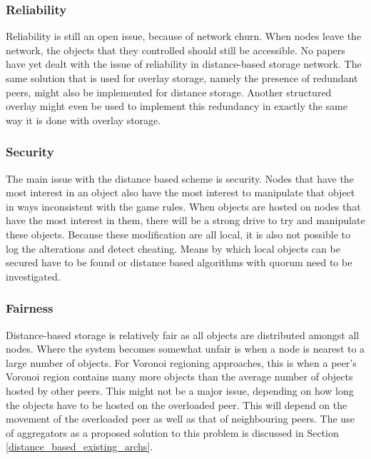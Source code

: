\documentclass[10pt,a4paper,journal,cspaper,compsoc]{IEEEtran}
\begin{document}
\subsubsection{Reliability}

Reliability is still an open issue, because of network churn. When nodes leave the network, the objects that they controlled should still be
accessible. No papers have yet dealt with the issue of reliability in distance-based storage network. The same solution that is used for overlay
storage, namely the presence of redundant peers, might also be implemented for distance storage. Another structured overlay might even be used to
implement this redundancy in exactly the same way it is done with overlay storage.

\subsubsection{Security}
\label{distance_based_storage_security}

The main issue with the distance based scheme is security. Nodes that have the most interest in an object also have the most interest to manipulate
that object in ways inconsistent with the game rules. When objects are hosted on nodes that have the most interest in them, there will be a strong
drive to try and manipulate these objects. Because these modification are all local, it is also not possible to log the alterations and detect
cheating. Means by which local objects can be secured have to be found or distance based algorithms with quorum need to be investigated.

\subsubsection{Fairness}

Distance-based storage is relatively fair as all objects are distributed amongst all nodes. Where the system becomes somewhat unfair is when a node
is nearest to a large number of objects. For Voronoi regioning approaches, this is when a peer's Voronoi region contains many more objects than the
average number of objects hosted by other peers. This might not be a major issue, depending on how long the objects have to be hosted on the
overloaded peer. This will depend on the movement of the overloaded peer as well as that of neighbouring peers. The use of aggregators as a proposed
solution to this problem is discussed in Section \ref{distance_based_existing_archs}.
\end{document}
